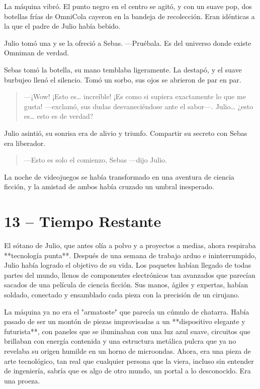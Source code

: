 \documentclass[a4paper,12pt]{book}
\begin{document}
La máquina vibró. El punto negro en el centro se agitó, y con un suave pop, dos botellas frías de OmniCola cayeron en la bandeja de recolección. Eran idénticas a la que el padre de Julio había bebido.

Julio tomó una y se la ofreció a Sebas. —Pruébala. Es del universo donde existe Omniman de verdad.

Sebas tomó la botella, su mano temblaba ligeramente. La destapó, y el suave burbujeo llenó el silencio. Tomó un sorbo, sus ojos se abrieron de par en par.

\begin{quote}
    —¡Wow! ¡Esto es… increíble! ¡Es como si supiera exactamente lo que me gusta! —exclamó, sus dudas desvaneciéndose ante el sabor—. Julio… ¿esto es… esto es de verdad?
\end{quote}

Julio asintió, su sonrisa era de alivio y triunfo. Compartir su secreto con Sebas era liberador.

\begin{quote}
    —Esto es solo el comienzo, Sebas —dijo Julio.
\end{quote}
La noche de videojuegos se había transformado en una aventura de ciencia ficción, y la amistad de ambos había cruzado un umbral inesperado.

\cleardoublepage %

\chapter*{13 – Tiempo Restante}

El sótano de Julio, que antes olía a polvo y a proyectos a medias, ahora respiraba **tecnología punta**. Después de una semana de trabajo arduo e ininterrumpido, Julio había logrado el objetivo de su vida. Los paquetes habían llegado de todas partes del mundo, llenos de componentes electrónicos tan avanzados que parecían sacados de una película de ciencia ficción. Sus manos, ágiles y expertas, habían soldado, conectado y ensamblado cada pieza con la precisión de un cirujano.

La máquina ya no era el "armatoste" que parecía un cúmulo de chatarra. Había pasado de ser un montón de piezas improvisadas a un **dispositivo elegante y futurista**, con paneles que se iluminaban con una luz azul suave, circuitos que brillaban con energía contenida y una estructura metálica pulcra que ya no revelaba su origen humilde en un horno de microondas. Ahora, era una pieza de arte tecnológico, tan real que cualquier persona que la viera, incluso sin entender de ingeniería, sabría que es algo de otro mundo, un portal a lo desconocido. Era una proeza.
\end{document}
